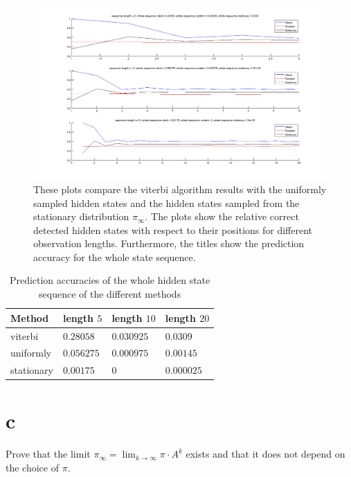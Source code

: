 \documentclass[a4paper, 12pt, titlepage]{article}
\begin{document}
\begin{figure}[h]
	\includegraphics[width=18cm]{images/experiment_results.png}
	\caption{These plots compare the viterbi algorithm results with the uniformly sampled hidden states and the hidden states sampled from the stationary distribution $\pi_{\infty}$. The plots show the relative correct detected hidden states with respect to their positions for different observation lengths. Furthermore, the titles show the prediction accuracy for the whole state sequence.}
	\label{fig:results}
\end{figure}

\begin{table}
	\centering
	\begin{tabular}{llll}
	Method & length $5$ &length $10$ & length $20$\\
	\hline
	viterbi & $0.28058$ & $0.030925$ & $0.0309$\\
	uniformly & $0.056275$ & $0.000975$ & $0.00145$\\
	stationary & $0.00175$ & $0$ & $0.000025$
	
	\end{tabular}
	\caption{Prediction accuracies of the whole hidden state sequence of the different methods}
	\label{tab:acc}
\end{table}

\section*{c}

Prove that the limit $\pi_\infty = \lim_{k\rightarrow \infty} \pi \cdot A^k$ exists and that it does not depend on the choice of $\pi$.
\end{document}
